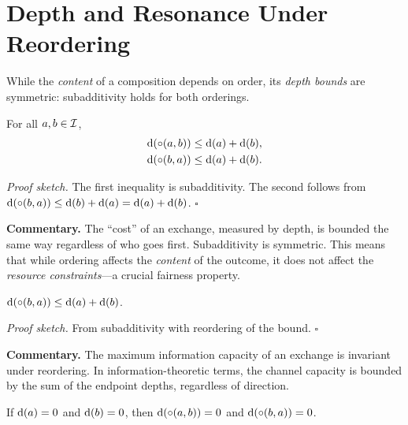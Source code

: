 \section{Depth and Resonance Under Reordering}
\label{sec:ch17-depth}

While the \emph{content} of a composition depends on order, its
\emph{depth bounds} are symmetric: subadditivity holds for both orderings.

\begin{theorem}
\label{thm:both_orders_depth_bound}
For all $a, b \in \mathcal{I}$,
\begin{align*}
  \operatorname{d}(\circ(a, b)) &\leq \operatorname{d}(a) + \operatorname{d}(b), \\
  \operatorname{d}(\circ(b, a)) &\leq \operatorname{d}(a) + \operatorname{d}(b).
\end{align*}
\end{theorem}

\noindent\textit{Proof sketch.}\quad
The first inequality is subadditivity.  The second follows from
$\operatorname{d}(\circ(b,a)) \leq \operatorname{d}(b) + \operatorname{d}(a) = \operatorname{d}(a) + \operatorname{d}(b)$.
\hfill$\square$

\medskip

\noindent\textbf{Commentary.}
The ``cost'' of an exchange, measured by depth, is bounded the same way
regardless of who goes first.  Subadditivity is symmetric.  This means that
while ordering affects the \emph{content} of the outcome, it does not affect
the \emph{resource constraints}---a crucial fairness property.

\begin{theorem}
\label{thm:depth_reorder_bound}
$\operatorname{d}(\circ(b, a)) \leq \operatorname{d}(a) + \operatorname{d}(b)$.
\end{theorem}

\noindent\textit{Proof sketch.}\quad
From subadditivity with reordering of the bound.
\hfill$\square$

\medskip

\noindent\textbf{Commentary.}
The maximum information capacity of an exchange is invariant under
reordering.  In information-theoretic terms, the channel capacity is
bounded by the sum of the endpoint depths, regardless of direction.

\begin{theorem}
\label{thm:depth_zero_both_orders}
If $\operatorname{d}(a) = 0$ and $\operatorname{d}(b) = 0$, then
$\operatorname{d}(\circ(a,b)) = 0$ and $\operatorname{d}(\circ(b,a)) = 0$.
\end{theorem}

